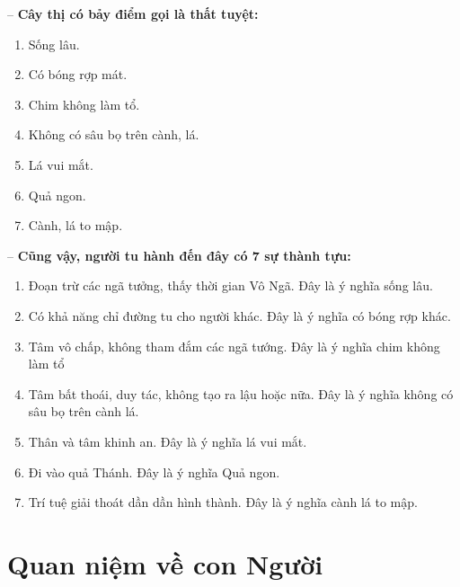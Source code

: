-- {\bf Cây thị có bảy điểm gọi là thất tuyệt:}

\begin{enumerate}[label=\itshape\arabic*\upshape/]

    \item Sống lâu.

    \item Có bóng rợp mát.

    \item Chim không làm tổ.

    \item Không có sâu bọ trên cành, lá.

    \item Lá vui mắt.

    \item Quả ngon.

    \item Cành, lá to mập.
\end{enumerate}

-- {\bf Cũng vậy, người tu hành đến đây có 7 sự thành tựu:}

\begin{enumerate}[label=\itshape\arabic*\upshape/]
    \item Đoạn trừ các ngã tưởng, thấy thời gian Vô Ngã. Đây là ý nghĩa sống lâu.

    \item Có khả năng chỉ đường tu cho người khác. Đây là ý nghĩa có bóng rợp khác.

    \item Tâm vô chấp, không tham đắm các ngã tướng. Đây là ý nghĩa chim không làm tổ

    \item Tâm bất thoái, duy tác, không tạo ra lậu hoặc nữa. Đây là ý nghĩa không có sâu bọ trên cành lá.

    \item Thân và tâm khinh an. Đây là ý nghĩa lá vui mắt.

    \item Đi vào quả Thánh. Đây là ý nghĩa Quả ngon.

    \item Trí tuệ giải thoát dần dần hình thành. Đây là ý nghĩa cành lá to mập.
\end{enumerate}

\section{Quan niệm về con Người} %
\label{sec:67_con_nguoi}

